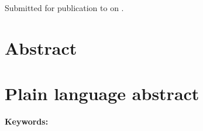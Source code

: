 \documentclass[onecolumn,12pt,a4paper]{article}
\begin{document}
\begin{FlushLeft}
    {\Large\bfseries \Title}
    \\[0.3cm]
    \Authors
    \\[0.3cm]
    {\Affiliations}
    \\[0.3cm]
    {Submitted for publication to \textit{\Journal{}} on \SubmittedOn.}
\end{FlushLeft}

\linenumbers

\section*{Abstract}



\section*{Plain language abstract}



\vspace{0.5cm}
\noindent
\textbf{Keywords:} \Keywords{}





\end{document}
